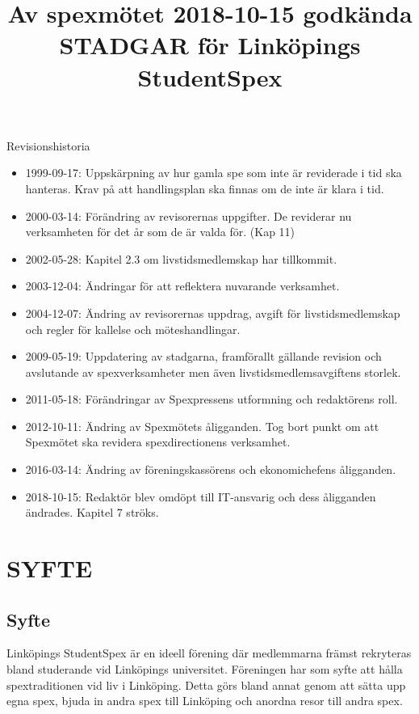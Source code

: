 \documentclass[a4paper]{article}
\title{Av spexmötet 2018-10-15 godkända STADGAR för Linköpings StudentSpex}
\author{}
\date{}
\begin{document}
\maketitle

{\Large Revisionshistoria }
\begin{itemize}
  \item 1999-09-17: Uppskärpning av hur gamla spe som inte är reviderade i tid ska hanteras. Krav på att handlingsplan ska finnas om de inte är klara i tid.
  \item 2000-03-14: Förändring av revisorernas uppgifter. De reviderar nu verksamheten för det år som de är valda för. (Kap 11)
  \item 2002-05-28: Kapitel 2.3 om livstidsmedlemskap har tillkommit.
  \item 2003-12-04: Ändringar för att reflektera nuvarande verksamhet.
  \item 2004-12-07: Ändring av revisorernas uppdrag, avgift för livstidsmedlemskap och regler för kallelse och möteshandlingar.
  \item 2009-05-19: Uppdatering av stadgarna, framförallt gällande revision och avslutande av spexverksamheter men även livstidsmedlemsavgiftens storlek.
  \item 2011-05-18: Förändringar av Spexpressens utformning och redaktörens roll.
  \item 2012-10-11: Ändring av Spexmötets åligganden. Tog bort punkt om att Spexmötet ska revidera spexdirectionens verksamhet.
  \item 2016-03-14: Ändring av föreningskassörens och ekonomichefens åligganden.
  \item 2018-10-15: Redaktör blev omdöpt till IT-ansvarig och dess åligganden ändrades. Kapitel 7 ströks.
\end{itemize}

\section{SYFTE}
\subsection{Syfte}
Linköpings StudentSpex är en ideell förening där medlemmarna främst rekryteras bland studerande vid Linköpings universitet. Föreningen har som syfte att hålla spextraditionen vid liv i Linköping. Detta görs bland annat genom att sätta upp egna spex, bjuda in andra spex till Linköping och anordna resor till andra spex.
\end{document}
